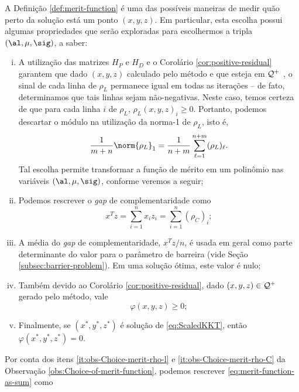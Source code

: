 \begin{obs}
\label{obs:Choice-of-merit-function}
A Definição \ref{def:merit-function} é uma das possíveis maneiras de medir quão
perto da solução está um ponto $(x,y,z)$. Em particular,  esta escolha possui algumas
propriedades que serão exploradas para escolhermos a tripla $(\al,\mu,\sig)$, a
saber:

\begin{enumerate}[(i)] 

	

\item \label{it:obs-Choice-merit-rho-l} A utilização das matrizes $H_P$ e $H_D$  e o Corolário
\ref{cor:positive-residual} garantem que dado $(x,y,z)$ calculado pelo
método e que esteja em $\mathcal{Q}^+$ ,  o sinal de cada linha de $\rho_{L}$ permanece igual em todas as iterações --  de fato, determinamos que tais linhas sejam não-negativas. Neste caso, temos certeza de que para cada linha $i$ de $\rho_{L}$,  $\rho_L(x,y,z)_{i}\geq 0$. Portanto, podemos descartar o módulo na utilização da norma-1 de $\rho_{L}$, isto é,
\[\frac{1}{m+n}\norm{\rho_L}_1 = \frac{1}{n+m}\sum_{\ell=1}^{n+m}(\rho_L)_\ell. \] 
Tal escolha permite transformar a função de mérito em um polinômio nas variáveis $(\al,\mu,\sig)$, conforme veremos a seguir; 



\item \label{it:obs-Choice-merit-rho-C} Podemos rescrever o
\emph{gap} de complementaridade como
 \[x^Tz = \sum_{i=1}^{n}x_iz_i = \sum_{i=1}^{n}(\rho_C)_i;\]

\item A média do \emph{gap} de complementaridade, $x^Tz/n$, é usada em geral
como parte determinante do valor para o parâmetro de barreira (vide Seção
\ref{subsec:barrier-problem}). Em uma solução ótima, este valor é
nulo;    
\item Também devido ao Corolário \ref{cor:positive-residual}, dado
$(x,y,z)\in\mathcal{Q}^+$ gerado pelo método, vale
\[
\varphi(x,y,z)\geq0;
\]
	\item Finalmente, se $(x^*,y^*,z^*)$ é solução de
\eqref{eq:ScaledKKT}, então $\varphi(x^*,y^*,z^*)=0$.
\end{enumerate}
\end{obs}


Por conta dos itens \eqref{it:obs-Choice-merit-rho-l} e \eqref{it:obs-Choice-merit-rho-C} da Observação \ref{obs:Choice-of-merit-function}, podemos rescrever
\eqref{eq:merit-function-as-sum} como


